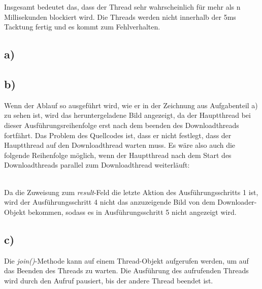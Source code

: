 \documentclass[ngerman]{fbi-aufgabenblatt}
\begin{document}
Insgesamt bedeutet das, dass der Thread sehr wahrscheinlich für mehr als n Millisekunden blockiert wird.
Die Threads werden nicht innerhalb der 5ms Tacktung fertig und es kommt zum Fehlverhalten.


\subsection*{a)}
\subsection*{b)}
Wenn der Ablauf so ausgeführt wird, wie er in der Zeichnung aus Aufgabenteil a) zu sehen ist, wird das heruntergeladene Bild angezeigt, da der Hauptthread bei dieser Ausführungsreihenfolge erst nach dem beenden des Downloadthreads fortfährt. Das Problem des Quellcodes ist, dass er nicht festlegt, dass der Hauptthread auf den Downloadthread warten muss. Es wäre also auch die folgende Reihenfolge möglich, wenn der Hauptthread nach dem Start des Downloadthreads parallel zum Downloadthread weiterläuft: \\

 \\
Da die Zuweisung zum \textit{result}-Feld die letzte Aktion des Ausführungsschritts 1 ist, wird der Ausführungsschritt 4 nicht das anzuzeigende Bild von dem Downloader-Objekt bekommen, sodass es in Ausführungsschritt 5 nicht angezeigt wird.
\subsection*{c)}
Die \textit{join()}-Methode kann auf einem Thread-Objekt aufgerufen werden, um auf das Beenden des Threads zu warten. Die Ausführung des aufrufenden Threads wird durch den Aufruf pausiert, bis der andere Thread beendet ist.
\end{document}
